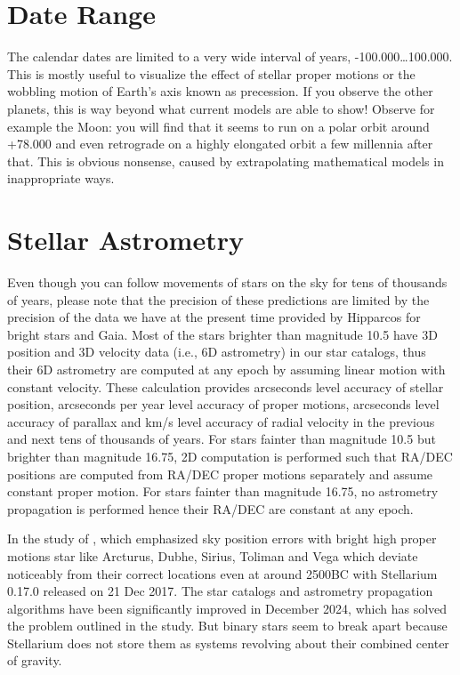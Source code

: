 \section{Date Range}
\label{sec:Accuracy:DateRange}

The calendar dates are limited to a very wide interval of years, -100.000\ldots100.000. 
This is mostly useful to visualize the effect of stellar proper motions or the wobbling 
motion of Earth's axis known as precession. 
If you observe the other planets, this is way beyond what current models are able to show! 
Observe for example the Moon: you will find that it seems to run 
on a polar orbit around +78.000 and even retrograde on a highly elongated orbit a few millennia after that. 
This is obvious nonsense, caused by extrapolating mathematical models in inappropriate ways. 

\section{Stellar Astrometry}
\label{sec:Accuracy:Astrometry}

Even though you can follow movements of stars on the sky for tens of thousands of years, 
please note that the precision of these predictions are limited by the precision of the data we have at 
the present time provided by Hipparcos for bright stars and Gaia. Most of the stars brighter than magnitude 10.5 
have 3D position and 3D velocity data (i.e., 6D astrometry) in our star catalogs, thus their 6D astrometry are computed 
at any epoch by assuming linear motion with constant velocity. These calculation provides arcseconds level accuracy
of stellar position, arcseconds per year level accuracy of proper motions, arcseconds level accuracy of parallax and km/s 
level accuracy of radial velocity in the previous and next tens of thousands of years. For stars fainter than magnitude 10.5 but brighter
than magnitude 16.75, 2D computation is performed such that RA/DEC positions are computed from RA/DEC proper motions separately and assume
constant proper motion. For stars fainter than magnitude 16.75, no astrometry propagation is performed hence their RA/DEC are constant at any epoch.

In the study of \citep{deLorenzis:2018}, which emphasized sky position errors with bright high proper motions star like Arcturus, 
Dubhe, Sirius, Toliman and Vega which deviate noticeably from their correct locations even at around 2500BC with Stellarium 
0.17.0 released on 21 Dec 2017. The star catalogs and astrometry propagation algorithms have been significantly improved in 
December 2024, which has solved the problem outlined in the study. But binary stars seem to break apart because Stellarium does 
not store them as systems revolving about their combined center of gravity.

